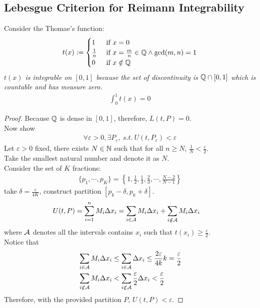 \documentclass[11pt]{article}
\begin{document}
	\subsection{Lebesgue Criterion for Reimann Integrability}
	\begin{example}
		Consider the Thomae's function:
		\begin{align}
			t(x) := \begin{cases}
				1 &\text{{ if }} x = 0 \\
				\frac{1}{n} &\text{{ if }} x = \frac{m}{n} \in \mathbb{Q} \land \gcd(m, n) = 1 \\
				0 &\text{{ if }} x \notin \mathbb{Q}
			\end{cases}
		\end{align}
		\emph{$t(x)$ is integrable on $[0, 1]$ because the set of discontinuity is $\mathbb{Q} \cap [0, 1]$ which is countable and has measure zero.}
		\begin{align}
			\int_0^1 t(x) = 0 
		\end{align}
	\end{example}
	
	\begin{proof}
		Because $\mathbb{Q}$ is dense in $[0, 1]$, therefore, $L(t, P) = 0$. \\
		Now show
		\begin{align}
			\forall \varepsilon > 0, \exists P_\varepsilon,\ s.t.\ U(t, P_\varepsilon) < \varepsilon
		\end{align}
		Let $\varepsilon > 0$ fixed, there exists $N \in \mathbb{N}$ such that for all $n \geq N$, $\frac{1}{N} < \frac{\varepsilon}{2}$. \\
		Take the smallest natural number and denote it as $N$. \\
		Consider the set of $K$ fractions:
		\begin{align}
			\{p_1, \cdots, p_K\} =  \left\{1, \frac{1}{2}, \frac{1}{3}, \frac{2}{3}, \cdots, \frac{N-2}{N-1} \right\}
		\end{align}
		take $\delta = \frac{\varepsilon}{4K}$, construct partition $[p_k - \delta, p_k + \delta]$.
		\begin{align}
			U(t, P) &= \sum_{i=1}^n M_i \Delta x_i = \sum_{i \in \mathcal{{A}}} M_i \Delta x_i + \sum_{i \notin \mathcal{{A}}} M_i \Delta x_i
		\end{align}
		where $\mathcal{{A}}$ denotes all the intervals contains $x_i$ such that $t(x_i) \geq \frac{\varepsilon}{2}$. \\
		Notice that
		\begin{align}
			&\sum_{i \in \mathcal{{A}}} M_i \Delta x_i 
			\leq \sum_{i \in \mathcal{{A}}} \Delta x_i 
			\leq \frac{2 \varepsilon}{4k} k 
			= \frac{\varepsilon}{2} \\
			&\sum_{i \notin \mathcal{{A}}} M_i \Delta x_i
			< \sum_{i \notin \mathcal{{A}}} \frac{\varepsilon}{2} \Delta x_i
			< \frac{\varepsilon}{2}
		\end{align}
		Therefore, with the provided partition $P$, $U(t, P) < \varepsilon$.
	\end{proof}
	
\end{document}
